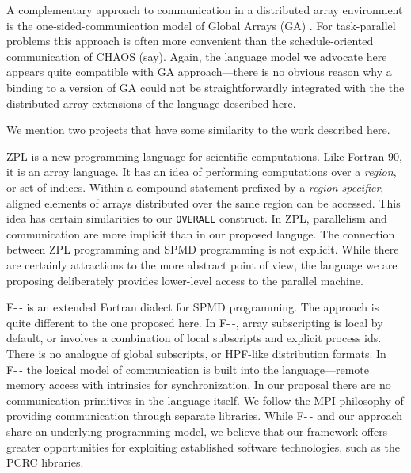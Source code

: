 A complementary approach to communication in a distributed array
environment is the one-sided-communication model of Global Arrays (GA)
\cite{Global_Arrays}.  For task-parallel problems this
approach is often more convenient than the schedule-oriented
communication of CHAOS (say).  Again, the language model we advocate
here appears quite compatible with GA approach---there is no obvious
reason why a binding to a version of GA could not be straightforwardly
integrated with the the distributed array extensions of the language
described here.

We mention two projects that have some similarity to the work
described here.

ZPL \cite{ZPL}
is a new programming language for scientific computations.
Like Fortran 90, it is an array language.  It has an idea of
performing computations over a {\em region}, or set of indices.
Within a compound statement prefixed by a {\em region specifier}, aligned
elements of arrays distributed over the same region can be accessed.
This idea has certain similarities to our {\tt OVERALL} construct.
In ZPL, parallelism and communication are more implicit than in our
proposed languge.  The connection between ZPL programming and SPMD
programming is not explicit.  While there are certainly attractions
to the more abstract point of view, the language we are proposing
deliberately provides lower-level access to the parallel machine.

F-\,- \cite{FMM}
is an extended Fortran dialect for SPMD programming.  The
approach is quite different to the one proposed here.  In F-\,-, array
subscripting is local by default, or involves a combination of local
subscripts and explicit process ids.  There is no analogue of global
subscripts, or HPF-like distribution formats.
In F-\,- the logical model of communication
is built into the language---remote memory access with intrinsics for
synchronization.
In our proposal there are no communication primitives in the language
itself.  We follow the MPI philosophy of providing communication
through separate libraries.  
While F-\,- and our approach share an underlying
programming model, we believe that our framework offers greater opportunities
for exploiting established software technologies, such as the PCRC libraries.







